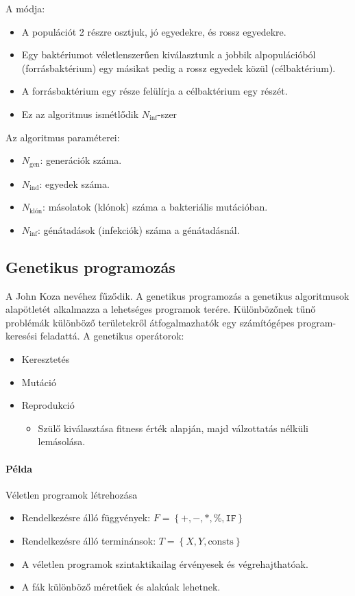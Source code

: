 \documentclass[../../main.tex]{subfiles}
\begin{document}
A  módja:
\begin{itemize}
  \item A populációt 2 részre osztjuk, jó egyedekre, és rossz egyedekre.
  \item Egy baktériumot véletlenszerűen kiválasztunk a jobbik alpopulációból
        (forrásbaktérium) egy másikat pedig a rossz egyedek közül (célbaktérium).
  \item A forrásbaktérium egy része felülírja a célbaktérium egy részét.
  \item Ez az algoritmus ismétlődik $N_\text{inf}$-szer
\end{itemize}

Az algoritmus paraméterei:
\begin{itemize}
  \item $N_\text{gen}$: generációk száma.
  \item $N_\text{ind}$: egyedek száma.
  \item $N_\text{klón}$: másolatok (klónok) száma a bakteriális mutációban.
  \item $N_\text{inf}$: génátadások (infekciók) száma a génátadásnál.
\end{itemize}

\subsection{Genetikus programozás}

A  John Koza nevéhez fűződik.
A genetikus programozás a genetikus algoritmusok alapötletét alkalmazza a
lehetséges programok terére. Különbözőnek tűnő problémák különböző területekről
átfogalmazhatók egy számítógépes program-keresési feladattá.
A genetikus operátorok:
\begin{itemize}
  \item Keresztetés
  \item Mutáció
  \item Reprodukció
        \begin{itemize}
          \item Szülő kiválasztása fitness érték alapján, majd válzottatás
                nélküli lemásolása.
        \end{itemize}
\end{itemize}

\paragraph{Példa} Véletlen programok létrehozása
\begin{itemize}
  \item Rendelkezésre álló függvények:
        $F = \left\{ +, -, *, \%, \texttt{IF} \right\}$
  \item Rendelkezésre álló terminánsok:
        $T = \left\{ X, Y, \text{consts} \right\}$
  \item A véletlen programok szintaktikailag érvényesek és végrehajthatóak.
  \item A fák különböző méretűek és alakúak lehetnek.
\end{itemize}
\end{document}
